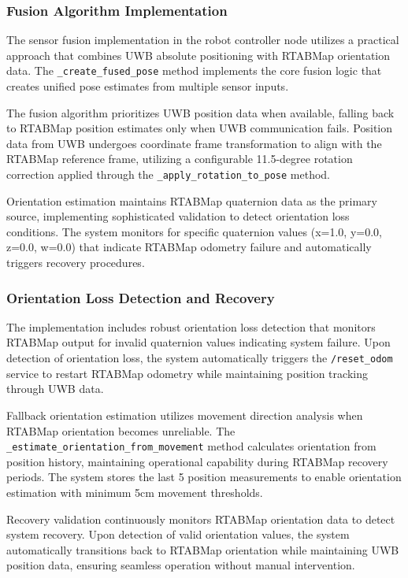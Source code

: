 \subsubsection{Fusion Algorithm Implementation}

The sensor fusion implementation in the robot controller node utilizes a practical approach that combines UWB absolute positioning with RTABMap orientation data. The \texttt{\_create\_fused\_pose} method implements the core fusion logic that creates unified pose estimates from multiple sensor inputs.

The fusion algorithm prioritizes UWB position data when available, falling back to RTABMap position estimates only when UWB communication fails. Position data from UWB undergoes coordinate frame transformation to align with the RTABMap reference frame, utilizing a configurable 11.5-degree rotation correction applied through the \texttt{\_apply\_rotation\_to\_pose} method.

Orientation estimation maintains RTABMap quaternion data as the primary source, implementing sophisticated validation to detect orientation loss conditions. The system monitors for specific quaternion values (x=1.0, y=0.0, z=0.0, w=0.0) that indicate RTABMap odometry failure and automatically triggers recovery procedures.

\subsubsection{Orientation Loss Detection and Recovery}

The implementation includes robust orientation loss detection that monitors RTABMap output for invalid quaternion values indicating system failure. Upon detection of orientation loss, the system automatically triggers the \texttt{/reset\_odom} service to restart RTABMap odometry while maintaining position tracking through UWB data.

Fallback orientation estimation utilizes movement direction analysis when RTABMap orientation becomes unreliable. The \texttt{\_estimate\_orientation\_from\_movement} method calculates orientation from position history, maintaining operational capability during RTABMap recovery periods. The system stores the last 5 position measurements to enable orientation estimation with minimum 5cm movement thresholds.

Recovery validation continuously monitors RTABMap orientation data to detect system recovery. Upon detection of valid orientation values, the system automatically transitions back to RTABMap orientation while maintaining UWB position data, ensuring seamless operation without manual intervention.

